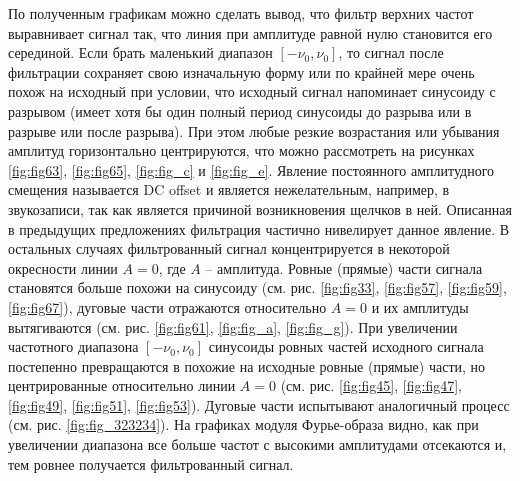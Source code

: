 \documentclass[a4paper, 12pt]{article}
\begin{document}
    По полученным графикам можно сделать вывод, что фильтр верхних частот выравнивает сигнал так, что линия при амплитуде равной
    нулю становится его серединой. Если брать маленький диапазон $[-\nu_0,\nu_0]$, то сигнал после фильтрации сохраняет свою
    изначальную форму или по крайней мере очень похож на исходный при условии, что исходный сигнал напоминает синусоиду с разрывом
    (имеет хотя бы один полный период синусоиды до разрыва или в разрыве или после разрыва). При этом любые резкие возрастания или
    убывания амплитуд горизонтально центрируются, что можно рассмотреть на рисунках \ref{fig:fig63}, \ref{fig:fig65}, \ref{fig:fig_c} и \ref{fig:fig_e}.
    Явление постоянного амплитудного смещения называется DC offset и является нежелательным, например, в звукозаписи, так как является
    причиной возникновения щелчков в ней. Описанная в предыдущих предложениях фильтрация частично нивелирует данное явление. В остальных
    случаях фильтрованный сигнал концентрируется в некоторой окресности линии $A=0$, где $A$ -- амплитуда. Ровные (прямые) части сигнала становятся
    больше похожи на синусоиду (см. рис. \ref{fig:fig33}, \ref{fig:fig57}, \ref{fig:fig59}, \ref{fig:fig67}), дуговые части отражаются относительно
    $A=0$ и их амплитуды вытягиваются (см. рис. \ref{fig:fig61}, \ref{fig:fig_a}, \ref{fig:fig_g}). При увеличении частотного диапазона $[-\nu_0,\nu_0]$
    синусоиды ровных частей исходного сигнала постепенно превращаются в похожие на исходные ровные (прямые) части, но центрированные относительно линии $A=0$
    (см. рис. \ref{fig:fig45}, \ref{fig:fig47}, \ref{fig:fig49}, \ref{fig:fig51}, \ref{fig:fig53}). Дуговые части испытывают аналогичный процесс (см. рис. \ref{fig:fig_323234}).
    На графиках модуля Фурье-образа видно, как при увеличении диапазона все больше частот с высокими амплитудами отсекаются и, тем ровнее получается
    фильтрованный сигнал.
\end{document}
